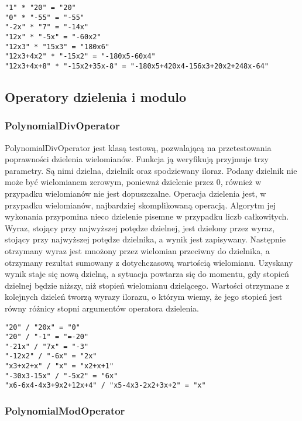 \documentclass[twoside,a4paper]{book}
\begin{document}
\begin{lstlisting}
"1" * "20" = "20"
"0" * "-55" = "-55"
"-2x" * "7" = "-14x"
"12x" * "-5x" = "-60x2"
"12x3" * "15x3" = "180x6"
"12x3+4x2" * "-15x2" = "-180x5-60x4"
"12x3+4x+8" * "-15x2+35x-8" = "-180x5+420x4-156x3+20x2+248x-64"
\end{lstlisting}

\subsection{Operatory dzielenia i modulo}

\subsubsection{PolynomialDivOperator}

PolynomialDivOperator jest klasą testową, pozwalającą na przetestowania poprawności dzielenia wielomianów. Funkcja ją weryfikują przyjmuje trzy parametry. Są nimi dzielna, dzielnik oraz spodziewany iloraz. Podany dzielnik nie może być wielomianem zerowym, ponieważ dzielenie przez 0, również w przypadku wielomianów nie jest dopuszczalne. Operacja dzielenia jest, w przypadku wielomianów, najbardziej skomplikowaną operacją. Algorytm jej wykonania przypomina nieco dzielenie pisemne w przypadku liczb całkowitych. Wyraz, stojący przy najwyższej potędze dzielnej, jest dzielony przez wyraz, stojący przy najwyższej potędze dzielnika, a wynik jest zapisywany. Następnie otrzymany wyraz jest mnożony przez wielomian przeciwny do dzielnika, a otrzymany rezultat sumowany z dotychczasową wartością wielomianu. Uzyskany wynik staje się nową dzielną, a sytuacja powtarza się do momentu, gdy stopień dzielnej będzie niższy, niż stopień wielomianu dzielącego. Wartości otrzymane z kolejnych dzieleń tworzą wyrazy ilorazu, o którym wiemy, że jego stopień jest równy różnicy stopni argumentów operatora dzielenia.

\begin{lstlisting}
"20" / "20x" = "0"
"20" / "-1" = "=-20"
"-21x" / "7x" = "-3"
"-12x2" / "-6x" = "2x"
"x3+x2+x" / "x" = "x2+x+1"
"-30x3-15x" / "-5x2" = "6x"
"x6-6x4-4x3+9x2+12x+4" / "x5-4x3-2x2+3x+2" = "x"
\end{lstlisting}

\subsubsection{PolynomialModOperator}
\end{document}
